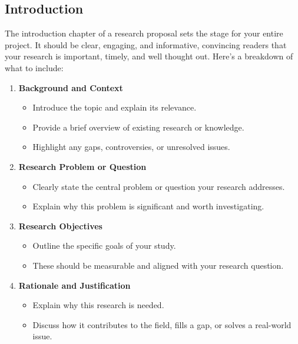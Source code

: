 \documentclass[PCOM,Proposal,Review]{mpThesis}
\newcommand{\Hd}[1]{{\color{SteelBlue}\bf#1}}
\begin{document}
\begin{MainMatter}
\chapter{Introduction}
\label{ch:introduction}
\minitoc

\begin{Remark}
The introduction chapter of a research proposal sets the stage for your entire project.
It should be clear, engaging, and informative, convincing readers that your research is important, timely, and well thought out.
Here's a breakdown of what to include:
\begin{enumerate}
\item \Hd{Background and Context}
  \begin{itemize}
  \item Introduce the topic and explain its relevance.

  \item Provide a brief overview of existing research or knowledge.

  \item Highlight any gaps, controversies, or unresolved issues.
  \end{itemize}

\item \Hd{Research Problem or Question}
  \begin{itemize}
  \item Clearly state the central problem or question your research addresses.

  \item Explain why this problem is significant and worth investigating.
  \end{itemize}

\item \Hd{Research Objectives}
  \begin{itemize}
  \item Outline the specific goals of your study.

  \item These should be measurable and aligned with your research question.
  \end{itemize}

\item \Hd{Rationale and Justification}
  \begin{itemize}
  \item Explain why this research is needed.

  \item Discuss how it contributes to the field, fills a gap, or solves a real-world issue.
  \end{itemize}


\end{enumerate}
\end{Remark}
\end{MainMatter}
\end{document}
